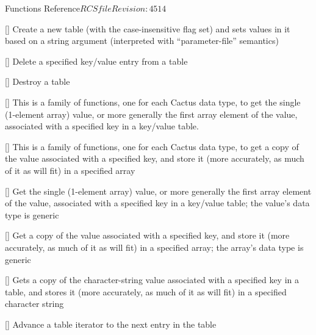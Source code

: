 \begin{cactuspart}{ Functions Reference}{$RCSfile$}{$Revision: 4514 $}
\begin{Lentry}
\item[\code{Util\_TableCreateFromString}]
     [\pageref{Util-TableCreateFromString}]
Create a new table (with the case-insensitive flag set) and sets
values in it based on a string argument (interpreted with
``parameter-file'' semantics)

\item[\code{Util\_TableDeleteKey}]
     [\pageref{Util-TableDeleteKey}]
Delete a specified key/value entry from a table

\item[\code{Util\_TableDestroy}]
     [\pageref{Util-TableDestroy}]
Destroy a table

\item[\code{Util\_TableGet*}]
     [\pageref{Util-TableGet*}]
This is a family of functions, one for each Cactus data type,
to get the single (1-element array) value, or more generally the
first array element of the value, associated with a specified key
in a key/value table.

\item[\code{Util\_TableGet*Array}]
     [\pageref{Util-TableGet*Array}]
This is a family of functions, one for each Cactus data type,
to get a copy of the value associated with a specified key, and store
it (more accurately, as much of it as will fit) in a specified array

\item[\code{Util\_TableGetGeneric}]
     [\pageref{Util-TableGetGeneric}]
Get the single (1-element array) value, or more generally the
first array element of the value, associated with a specified key
in a key/value table; the value's data type is generic

\item[\code{Util\_TableGetGenericArray}]
     [\pageref{Util-TableGetGenericArray}]
Get a copy of the value associated with a specified key, and store
it (more accurately, as much of it as will fit) in a specified array;
the array's data type is generic

\item[\code{Util\_TableGetString}]
     [\pageref{Util-TableGetString}]
Gets a copy of the character-string value associated with a specified
key in a table, and stores it (more accurately, as much of it as will fit)
in a specified character string

\item[\code{Util\_TableItAdvance}]
     [\pageref{Util-TableItAdvance}]
Advance a table iterator to the next entry in the table


\end{Lentry}
\end{cactuspart}
